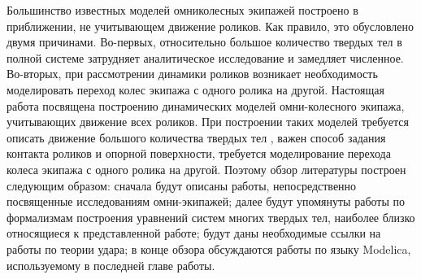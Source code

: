 Большинство известных моделей омниколесных экипажей построено в приближении, не учитывающем движение роликов. Как правило, это обусловлено двумя причинами. Во-первых, относительно большое количество твердых тел в полной системе затрудняет аналитическое исследование и замедляет численное. Во-вторых, при рассмотрении динамики роликов возникает необходимость моделировать переход колес экипажа с одного ролика на другой.
Настоящая работа посвящена построению динамических моделей омни-колесного экипажа, учитывающих движение всех роликов.%
При построении таких моделей требуется описать движение большого количества твердых тел%
, важен способ задания контакта роликов и опорной поверхности, требуется моделирование перехода колеса экипажа с одного ролика на другой.
Поэтому обзор литературы построен следующим образом: сначала будут описаны работы, непосредственно посвященные исследованиям омни-экипажей; далее будут упомянуты работы по формализмам построения уравнений систем многих твердых тел, наиболее близко относящиеся к представленной работе; будут даны необходимые ссылки на работы по теории удара; в конце обзора обсуждаются работы по языку Modelica, используемому в последней главе работы.


